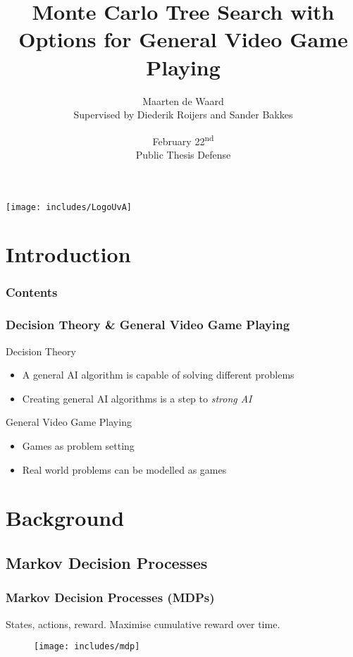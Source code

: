 \documentclass{beamer}
\author[Maarten de Waard]{Maarten de Waard\\\small{Supervised by Diederik
	Roijers and Sander Bakkes}}
\title[O-MCTS for GVGP]{Monte Carlo Tree Search with Options for General Video Game Playing}
\date{February 22\textsuperscript{nd}\\Public Thesis Defense}
\begin{document}
\begin{frame}
	\vspace{-4.7em}
	\centerline{
	\texttt{[image: includes/LogoUvA]}
	}
	\maketitle
\end{frame}

\section{Introduction}

\begin{frame}
	\frametitle{Contents}
	\tableofcontents
\end{frame}

\begin{frame}
	\frametitle{Decision Theory \& General Video Game Playing}
	\begin{block}{Decision Theory}
		\begin{itemize}
			\item A general AI algorithm is capable of solving different problems
			\item Creating general AI algorithms is a step to \emph{strong AI}
		\end{itemize}
	\end{block}
	\begin{block}{General Video Game Playing}
		\begin{itemize}
			\item Games as problem setting
			\item Real world problems can be modelled as games
		\end{itemize}
	\end{block}
\end{frame}

\section{Background}

\subsection{Markov Decision Processes}
\begin{frame}
	\frametitle{Markov Decision Processes (MDPs)}
	States, actions, reward. Maximise cumulative reward over time.
	\begin{figure}
	\centering
	\texttt{[image: includes/mdp]}
	\end{figure}
\end{frame}
\end{document}
